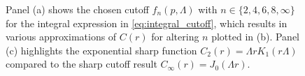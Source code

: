 \begin{figure}
    \caption{Panel (a) shows the chosen cutoff $f_n(p,\Lambda)$ with $n\in\{2,4,6,8,\infty\}$ for the integral expression in \cref{eq:integral_cutoff}, which results in various approximations of $C(r)$ for altering $n$ plotted in (b). Panel (c) highlights the exponential sharp function $C_2(r)=\Lambda rK_1(r\Lambda)$ compared to the sharp cutoff result $C_\infty(r)=J_0(\Lambda r)$.}
    \label{fig:rg_cutoff}
\end{figure}
